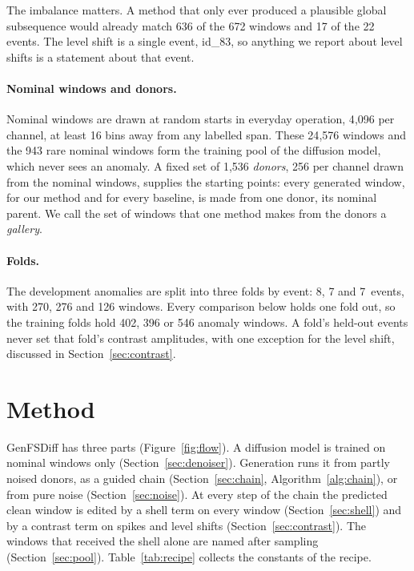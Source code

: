 \documentclass[11pt,a4paper]{article}
\begin{document}
The imbalance matters. A method that only ever produced a plausible global
subsequence would already match 636 of the 672 windows and 17 of the 22
events. The level shift is a single event, id\_83, so anything we report about
level shifts is a statement about that event.

\paragraph{Nominal windows and donors.}
Nominal windows are drawn at random starts in everyday operation, 4{,}096 per
channel, at least 16 bins away from any labelled span. These 24{,}576 windows
and the 943 rare nominal windows form the training pool of the diffusion
model, which never sees an anomaly. A fixed set of 1{,}536 \emph{donors}, 256
per channel drawn from the nominal windows, supplies the starting points:
every generated window, for our method and for every baseline, is made from
one donor, its nominal parent. We call the set of windows that one method
makes from the donors a \emph{gallery}.

\paragraph{Folds.}
The development anomalies are split into three folds by event: 8, 7 and
7~events, with 270, 276 and 126 windows. Every comparison below holds one fold
out, so the training folds hold 402, 396 or 546 anomaly windows. A fold's
held-out events never set that fold's contrast amplitudes, with one exception
for the level shift, discussed in Section~\ref{sec:contrast}.

\section{Method}
\label{sec:method}

GenFSDiff has three parts (Figure~\ref{fig:flow}). A diffusion model is
trained on nominal windows only (Section~\ref{sec:denoiser}). Generation runs
it from partly noised donors, as a guided chain (Section~\ref{sec:chain},
Algorithm~\ref{alg:chain}), or from pure noise (Section~\ref{sec:noise}). At every step of the chain the predicted clean
window is edited by a shell term on every window (Section~\ref{sec:shell}) and
by a contrast term on spikes and level shifts (Section~\ref{sec:contrast}).
The windows that received the shell alone are named after sampling
(Section~\ref{sec:pool}). Table~\ref{tab:recipe} collects the constants of the
recipe.
\end{document}
